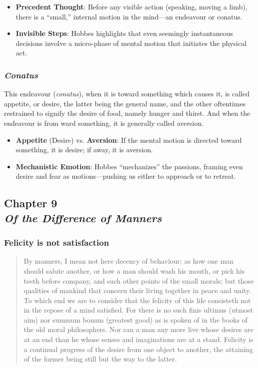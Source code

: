             \begin{itemize}
                \item \textbf{Precedent Thought}: Before any visible action (speaking, moving a limb), there is a “small,” internal motion in the mind—an endeavour or conatus.
                \item \textbf{Invisible Steps}: Hobbes highlights that even seemingly instantaneous decisions involve a micro-phase of mental motion that initiates the physical act.
            \end{itemize}

        \subsubsection{\textit{Conatus}}

            This endeavour (\textit{conatus}), when it is toward something which causes it, is called appetite, or desire, the latter being the general name, and the other oftentimes restrained to signify the desire of food, namely hunger and thirst. And when the endeavour is from ward something, it is generally called aversion.

            \begin{itemize}
                \item \textbf{Appetite} (Desire) vs. \textbf{Aversion}: If the mental motion is directed toward something, it is desire; if away, it is aversion.
                \item \textbf{Mechanistic Emotion}: Hobbes “mechanizes” the passions, framing even desire and fear as motions—pushing us either to approach or to retreat.
            \end{itemize}

    \subsection[Of the Difference of Manners]{Chapter 9 \\ \textit{Of the Difference of Manners}}

        \subsubsection{Felicity is not satisfaction}

            \begin{quote}
                By manners, I mean not here decency of behaviour; as how one man should salute another, or how a man should wash his mouth, or pick his teeth before company, and such other points of the small morals; but those qualities of mankind that concern their living together in peace and unity. To which end we are to consider that the felicity of this life consisteth not in the repose of a mind satisfied. For there is no such finis ultimus (utmost aim) nor summum bonum (greatest good) as is spoken of in the books of the old moral philosophers. Nor can a man any more live whose desires are at an end than he whose senses and imaginations are at a stand. Felicity is a continual progress of the desire from one object to another, the attaining of the former being still but the way to the latter.
            \end{quote}

